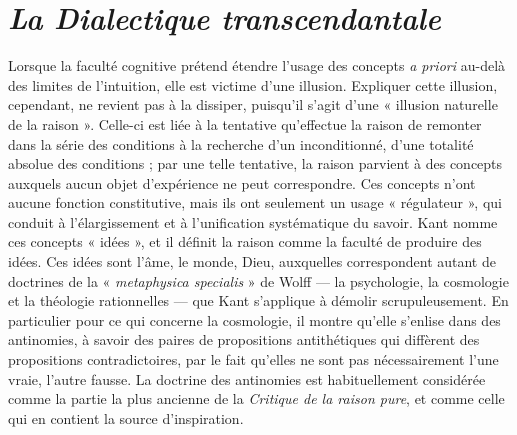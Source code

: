 
\section{{\it La Dialectique transcendantale}}


Lorsque la faculté cognitive prétend
étendre l’usage des concepts {\it a priori} au-delà
des limites de l’intuition, elle est victime
d’une illusion. Expliquer cette illusion,
cependant, ne revient pas à la
dissiper, puisqu'il s’agit d’une « illusion
naturelle de la raison ». Celle-ci est liée à
la tentative qu’effectue la raison de
remonter dans la série des conditions à la
recherche d’un inconditionné, d’une totalité
absolue des conditions ; par une telle
tentative, la raison parvient à des
concepts auxquels aucun objet d’expérience
ne peut correspondre. Ces
concepts n’ont aucune fonction constitutive,
mais ils ont seulement un usage « régulateur »,
qui conduit à l’élargissement
et à l’unification systématique du savoir.
Kant nomme ces concepts « idées », et il
définit la raison comme la faculté de produire
des idées. Ces idées sont l’âme, le
monde, Dieu, auxquelles correspondent
autant de doctrines de la « {\it metaphysica
specialis} » de Wolff — la psychologie, la
cosmologie et la théologie rationnelles —
que Kant s’applique à démolir scrupuleusement.
En particulier pour ce qui
concerne la cosmologie, il montre qu’elle
s’enlise dans des antinomies, à savoir des
paires de propositions antithétiques qui
diffèrent des propositions contradictoires,
par le fait qu’elles ne sont pas nécessairement
l’une vraie, l’autre fausse. La doctrine
des antinomies est habituellement
considérée comme la partie la plus
ancienne de la {\it Critique de la raison pure},
et comme celle qui en contient la source
d'inspiration.
